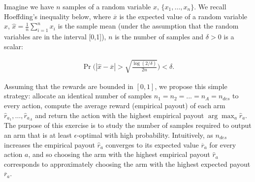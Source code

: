 \documentclass{article}
\begin{document}
Imagine we have $n$ samples of a random variable $x$, $\{x_1, \dots, x_n\}$. We recall Hoeffding's inequality below, where $\overline x$ is the expected value of a random variable $x$, $\widehat x= \frac{1}{n} \sum_{i=1}^n x_i$ is the sample mean (under the assumption that the random variables are in the interval [0,1]), $n$ is the number of samples  and $\delta >0$ is a scalar:

\begin{align*}
\Pr\Bigg(|\widehat x - \overline x | > \sqrt{\frac{\log(2/\delta)}{2n}}	\Bigg) < \delta.
\end{align*}

Assuming that the rewards are bounded in $[0,1]$,
we propose this simple strategy: allocate an identical number of samples $n_1 = n_2=...=n_{A} = n_{des}$ to every action, compute the average reward (empirical payout) of each arm $\widehat r_{a_1}, \dots, \widehat r_{a_A}$ and return the action with the highest empirical payout $\arg\max_a \widehat r_{a}$. The purpose of this exercise is to study the number of samples required to output an arm that is at least $\epsilon$-optimal with high probability.
Intuitively, as $n_{des}$ increases the empirical payout $\widehat r_a$ converges to its expected value $\overline r_a$ for every action $a$, and so choosing the arm with the highest empirical payout $\widehat r_a$ corresponds to approximately choosing the arm with the highest expected payout $\overline r_a$.
\end{document}
